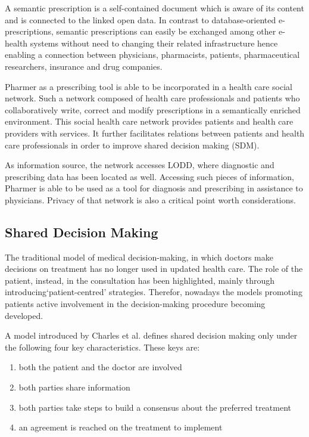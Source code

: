 \documentclass[journal]{IEEEtran}
\begin{document}
A semantic prescription is a self-contained document which is aware of its content and is connected to the linked open data.
In contrast to database-oriented e-prescriptions, semantic prescriptions can easily be exchanged among other e-health systems without need to changing their related infrastructure hence enabling a connection between physicians, pharmacists, patients, pharmaceutical researchers, insurance and drug companies.

Pharmer as a prescribing tool is able to be incorporated in a health care social network.
Such a network composed of health care professionals and patients who collaboratively write, correct and modify prescriptions in a semantically enriched environment.
This social health care network provides patients and health care providers with services.
It further facilitates relations between patients and health care professionals in order to improve shared decision making (SDM).

As information source, the network accesses LODD, where diagnostic and prescribing data has been located as well.
Accessing such pieces of information, Pharmer is able to be used as a tool for diagnosis and prescribing in assistance to physicians.
Privacy of that network is also a critical point worth considerations.

\subsection{Shared Decision Making}
\label{subsec: SDM}
 The traditional model of medical decision-making, in which doctors make decisions on treatment has no longer used in updated health care.
 The role of the patient, instead, in the consultation has been highlighted, mainly through introducing‘patient-centred’ strategies.
 Therefor, nowadays the models promoting patients active involvement in the decision-making procedure becoming developed.
 
 A model introduced by Charles et al. defines shared decision making only under the following four key characteristics.
 These keys are:
 \begin{enumerate}
   \item both the patient and the doctor are involved
   \item both parties share information
   \item both parties take steps to build a consensus about the preferred treatment
   \item an agreement is reached on the treatment to implement
 \end{enumerate}
\end{document}
